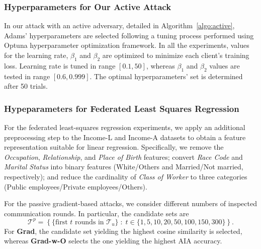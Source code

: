 \subsubsection{Hyperparameters for Our Active Attack}
 
In our attack with an active adversary, detailed in Algorithm~\ref{algo:active}, Adams' hyperparameters are selected following a tuning process performed using Optuna \cite{optuna} hyperparameter optimization framework. In all the experiments, values for the learning rate, $\beta_1$ and $\beta_2$ are optimized to minimize each client's training loss. Learning rate is tuned in range $[0.1, 50]$, whereas $\beta_1$ and $\beta_2$ values are tested in range $[0.6, 0.999]$. The optimal hyperparameters' set is determined after 50 trials.

\subsubsection{Hypeparameters for Federated Least Squares Regression}

For the federated least-squares regression experiments, we apply an additional preprocessing step to the Income-L and Income-A datasets to obtain a feature representation suitable for linear regression. Specifically, we remove the \emph{Occupation}, \emph{Relationship}, and \emph{Place of Birth} features; convert \emph{Race Code} and \emph{Marital Status} into binary features (White/Others and Married/Not married, respectively); and reduce the cardinality of \emph{Class of Worker} to three categories (Public employees/Private employees/Others).

For the passive gradient-based attacks, we consider different numbers of inspected communication rounds. In particular, the candidate sets are
\[
    \mathcal{T}^{p}
    =
    \left\{
        \{\text{first } t \text{ rounds in } \mathcal{T}_u\}
        \;:\;
        t \in \{1,5,10,20,50,100,150,300\}
    \right\}.
\]
For \textbf{Grad}, the candidate set yielding the highest cosine similarity is selected, whereas \textbf{Grad-w-O} selects the one yielding the highest AIA accuracy.

